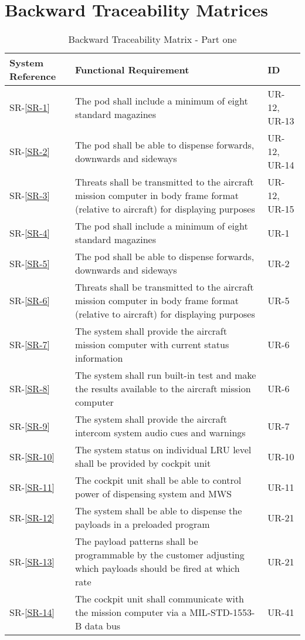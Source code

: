 \documentclass[Main]{subfiles}
\begin{document}
\section{Backward Traceability Matrices}

\begin{table}[htbp]
	\centering
	\begin{tabular}{p{1.8cm} p{11cm} l} \hline
	System Reference & Functional Requirement & ID\\\hline
	SR-\ref{SR-1} & The pod shall include a minimum of eight standard magazines & UR-12, UR-13 \\
	SR-\ref{SR-2} & The pod shall be able to dispense forwards, downwards and sideways & UR-12, UR-14 \\
	SR-\ref{SR-3} & Threats shall be transmitted to the aircraft mission computer in body frame format (relative to aircraft) for displaying purposes & UR-12, UR-15 \\
	SR-\ref{SR-4} & The pod shall include a minimum of eight standard magazines & UR-1 \\
	SR-\ref{SR-5} & The pod shall be able to dispense forwards, downwards and sideways & UR-2 \\
	SR-\ref{SR-6} & Threats shall be transmitted to the aircraft mission computer in body frame format
	(relative to aircraft) for displaying purposes & UR-5 \\
	SR-\ref{SR-7} & The system shall provide the aircraft mission computer with current status information & UR-6 \\
	SR-\ref{SR-8} &  The system shall run built-in test and make the results available to the aircraft mission
	computer & UR-6 \\
	SR-\ref{SR-9} & The system shall provide the aircraft intercom system audio cues and warnings & UR-7 \\
	SR-\ref{SR-10} &  The system status on individual LRU level shall be provided by cockpit unit & UR-10 \\
	SR-\ref{SR-11} & The cockpit unit shall be able to control power of dispensing system and MWS & UR-11 \\
	SR-\ref{SR-12} & The system shall be able to dispense the payloads in a preloaded program & UR-21 \\
	SR-\ref{SR-13} & The payload patterns shall be programmable by the customer adjusting which payloads
	should be fired at which rate & UR-21 \\
	SR-\ref{SR-14} & The cockpit unit shall communicate with the mission computer via a MIL-STD-1553-B
	data bus & UR-41 \\\hline
	\end{tabular}
\caption{Backward Traceability Matrix - Part one}
\label{Tab:BackwardPartOne}
\end{table}
\end{document}
